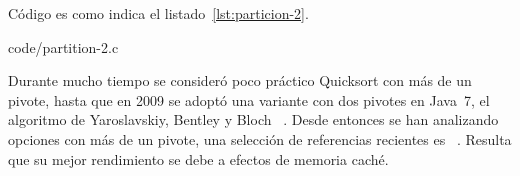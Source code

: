   Código es como indica el listado~\ref{lst:particion-2}.
  
                   {code/partition-2.c}

  Durante mucho tiempo se consideró poco práctico
  Quicksort con más de un pivote,
  hasta que en 2009 se adoptó una variante con dos pivotes en Java~7,
  el algoritmo de Yaroslavskiy, Bentley y Bloch~%
    \cite{yaroslavskiy09:_dual_pivot_quick_algor}.
  Desde entonces se han analizando opciones con más de un pivote,
  una selección de referencias recientes es~%
    \cite{aumueller16:_how_good_multi_pivot_quicksort,
          kushagra14:_multi_pivot_quicksort}.
  Resulta que su mejor rendimiento se debe a efectos de memoria caché.






